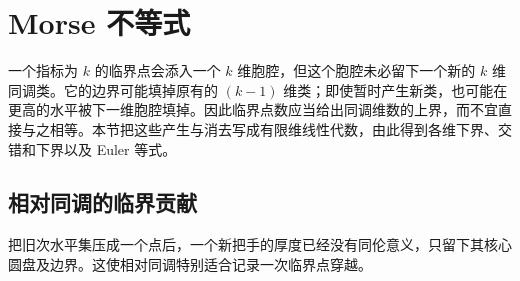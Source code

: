 
% 
% 

\section{Morse 不等式}
\label{g2:sec:1703}

一个指标为 \(k\) 的临界点会添入一个 \(k\) 维胞腔，但这个胞腔未必留下一个新的 \(k\) 维同调类。它的边界可能填掉原有的 \((k-1)\) 维类；即使暂时产生新类，也可能在更高的水平被下一维胞腔填掉。因此临界点数应当给出同调维数的上界，而不宜直接与之相等。本节把这些产生与消去写成有限维线性代数，由此得到各维下界、交错和下界以及 Euler 等式。

\subsection{相对同调的临界贡献}
\label{g2:subsec:1703:01}

把旧次水平集压成一个点后，一个新把手的厚度已经没有同伦意义，只留下其核心圆盘及边界。这使相对同调特别适合记录一次临界点穿越。

